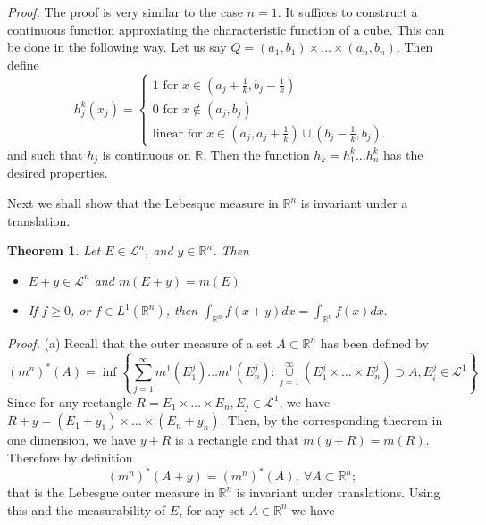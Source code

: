 \documentclass[12pt]{report}
\newtheorem{theorem}{Theorem}[section]
\begin{document}
\vspace{.25cm}
\noindent
{\em Proof.}  The proof is very similar to the case $n =1$.  It suffices
to construct a continuous function approxiating the characteristic 
function of a cube.  This can be done in the following way.  Let us say $Q =
(a_1, b_1) \times \dots \times (a_n, b_n)$.  Then define
\[
h^k_j(x_j) = \left \{ \begin{array}{ll}
1 \mbox{ for } x \in \left (a_j + \frac{1}{k}, b_j - \frac{1}{k} \right )\\
0 \mbox{ for } x \notin (a_j, b_j)\\
\mbox{linear for } x \in\left  (a_j, a_j + \frac{1}{k}\right ) \cup \left ( b_j -
\frac{1}{k}, b_j\right ).\end{array}
\right.
\]
and such that $h_j$ is continuous on $\mathbb{R}$.  Then the function $h_k
= h^k_1 \dots h^k_n$ has the desired properties.

\vspace{.25cm}
\noindent
Next we shall show that the Lebesque measure in $\mathbb{R}^n$ is
invariant under a translation.

\begin{theorem}  Let $E \in \mathcal{L}^n$, and $y \in
\mathbb{R}^n$.  Then
\begin{itemize}
\item[(a)]  $E + y \in \mathcal{L}^n$ and $m (E + y) = m(E)$
\item[(b)]  If $f \ge 0$, or $f \in L^1 (\mathbb{R}^n)$, then
$\int_{\mathbb{R}^n} f(x+y) dx = \int_{\mathbb{R}^n} f(x) dx.$
\end{itemize}
\end{theorem}

\noindent
{\em Proof.}
(a) Recall that the outer measure of a set $A \subset
\mathbb{R}^n$ has been defined by 
\[
(m^n)^*(A) = \inf \left \{\sum^\infty_{j=1} m^1 (E^j_1) \dots m^1
(E^j_n):  \overset{\infty}{\underset{j=1}{\cup}} (E^j_1 \times \dots
\times E^j_n) \supset A, E^j_i \in \mathcal{L}^1\right \}
\]
Since for any rectangle $R = E_1 \times \dots \times E_n, E_j \in
\mathcal{L}^1$, we have $R +  y = (E_1 + y_1)\times \dots \times
(E_n + y_n)$. Then, by the corresponding theorem in  one dimension,
we have 
$y + R$ is a rectangle and that $m(y + R) = m(R)$.  Therefore by
definition
\[
(m^n)^* (A+y) = (m^n)^* (A), \ \forall A \subset \mathbb{R}^n;
\]
that is the Lebesgue outer measure in $\mathbb{R}^n$ is invariant
under translations. Using  this and the measurability of $E$,
 for any set
$A \in \mathbb{R}^n$ we have
\end{document}
